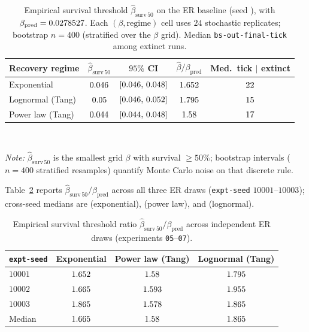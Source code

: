 \documentclass[11pt,a4paper]{article}
\begin{document}
\begin{table}[htbp]
  \centering
  \small
  \caption{Empirical survival threshold $\hat{\beta}_{\mathrm{surv}\,50}$ on the ER baseline (seed \RepPrimarySeed), with $\beta_{\mathrm{pred}}=0.0278527$. Each $(\beta,\text{regime})$ cell uses $24$ stochastic replicates; bootstrap $n=400$ (stratified over the $\beta$ grid). Median \texttt{bs-out-final-tick} among extinct runs.}
  \label{tab:thresholds}
  \begin{tabular}{lcccc}
    \toprule
    Recovery regime & $\hat{\beta}_{\mathrm{surv}\,50}$ & $95\%$ CI & $\hat{\beta}/\beta_{\mathrm{pred}}$ & Med.\ tick $|$ extinct \\
    \midrule
    Exponential & $0.046$ & $[0.046,\,0.048]$ & $1.652$ & $22$ \\
    Lognormal (Tang) & $0.05$ & $[0.046,\,0.052]$ & $1.795$ & $15$ \\
    Power law (Tang) & $0.044$ & $[0.044,\,0.048]$ & $1.58$ & $17$ \\
    \bottomrule
  \end{tabular}
  \\[0.5em]
  \begin{minipage}{\linewidth}
  \footnotesize
  \emph{Note:} $\hat{\beta}_{\mathrm{surv}\,50}$ is the smallest grid $\beta$ with survival $\ge 50\%$; bootstrap intervals ($n{=}400$ stratified resamples) quantify Monte Carlo noise on that discrete rule.
  \end{minipage}
\end{table}

Table~\ref{tab:thresholds-seeds} reports $\hat{\beta}_{\mathrm{surv}\,50}/\beta_{\mathrm{pred}}$ across all three ER draws (\texttt{expt-seed} $10001$--$10003$); cross-seed medians are \RepRatioExpMed{} (exponential), \RepRatioPLMed{} (power law), and \RepRatioLognMed{} (lognormal).

\begin{table}[htbp]
  \centering
  \small
  \caption{Empirical survival threshold ratio $\hat{\beta}_{\mathrm{surv}\,50}/\beta_{\mathrm{pred}}$ across independent ER draws (experiments \texttt{05}--\texttt{07}).}
  \label{tab:thresholds-seeds}
  \begin{tabular}{lccc}
    \toprule
    \texttt{expt-seed} & Exponential & Power law (Tang) & Lognormal (Tang) \\
    \midrule
    $10001$ & $1.652$ & $1.58$ & $1.795$ \\
    $10002$ & $1.665$ & $1.593$ & $1.955$ \\
    $10003$ & $1.865$ & $1.578$ & $1.865$ \\
    \midrule
    Median & $1.665$ & $1.58$ & $1.865$ \\
    \bottomrule
  \end{tabular}
\end{table}
\end{document}
